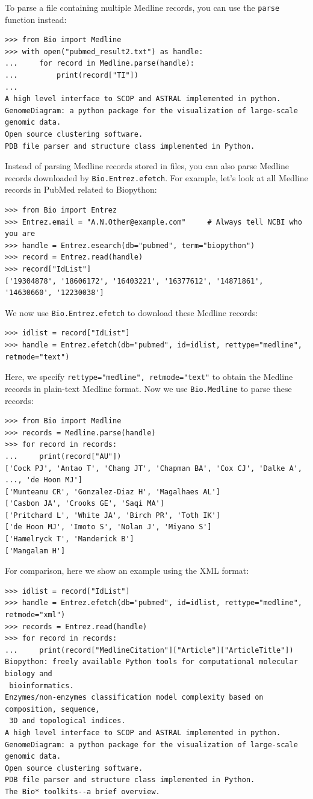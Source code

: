 \documentclass{report}
\begin{document}
To parse a file containing multiple Medline records, you can use the \verb+parse+ function instead:
\begin{verbatim}
>>> from Bio import Medline
>>> with open("pubmed_result2.txt") as handle:
...     for record in Medline.parse(handle):
...         print(record["TI"])
...
A high level interface to SCOP and ASTRAL implemented in python.
GenomeDiagram: a python package for the visualization of large-scale genomic data.
Open source clustering software.
PDB file parser and structure class implemented in Python.
\end{verbatim}

Instead of parsing Medline records stored in files, you can also parse Medline records downloaded by \verb+Bio.Entrez.efetch+. For example, let's look at all Medline records in PubMed related to Biopython:
\begin{verbatim}
>>> from Bio import Entrez
>>> Entrez.email = "A.N.Other@example.com"     # Always tell NCBI who you are
>>> handle = Entrez.esearch(db="pubmed", term="biopython")
>>> record = Entrez.read(handle)
>>> record["IdList"]
['19304878', '18606172', '16403221', '16377612', '14871861', '14630660', '12230038']
\end{verbatim}
We now use \verb+Bio.Entrez.efetch+ to download these Medline records:
\begin{verbatim}
>>> idlist = record["IdList"]
>>> handle = Entrez.efetch(db="pubmed", id=idlist, rettype="medline", retmode="text")
\end{verbatim}
Here, we specify \verb+rettype="medline", retmode="text"+ to obtain the Medline records in plain-text Medline format. Now we use \verb+Bio.Medline+ to parse these records:
\begin{verbatim}
>>> from Bio import Medline
>>> records = Medline.parse(handle)
>>> for record in records:
...     print(record["AU"])
['Cock PJ', 'Antao T', 'Chang JT', 'Chapman BA', 'Cox CJ', 'Dalke A', ..., 'de Hoon MJ']
['Munteanu CR', 'Gonzalez-Diaz H', 'Magalhaes AL']
['Casbon JA', 'Crooks GE', 'Saqi MA']
['Pritchard L', 'White JA', 'Birch PR', 'Toth IK']
['de Hoon MJ', 'Imoto S', 'Nolan J', 'Miyano S']
['Hamelryck T', 'Manderick B']
['Mangalam H']
\end{verbatim}

For comparison, here we show an example using the XML format:
\begin{verbatim}
>>> idlist = record["IdList"]
>>> handle = Entrez.efetch(db="pubmed", id=idlist, rettype="medline", retmode="xml")
>>> records = Entrez.read(handle)
>>> for record in records:
...     print(record["MedlineCitation"]["Article"]["ArticleTitle"])
Biopython: freely available Python tools for computational molecular biology and
 bioinformatics.
Enzymes/non-enzymes classification model complexity based on composition, sequence,
 3D and topological indices.
A high level interface to SCOP and ASTRAL implemented in python.
GenomeDiagram: a python package for the visualization of large-scale genomic data.
Open source clustering software.
PDB file parser and structure class implemented in Python.
The Bio* toolkits--a brief overview.
\end{verbatim}
\end{document}
